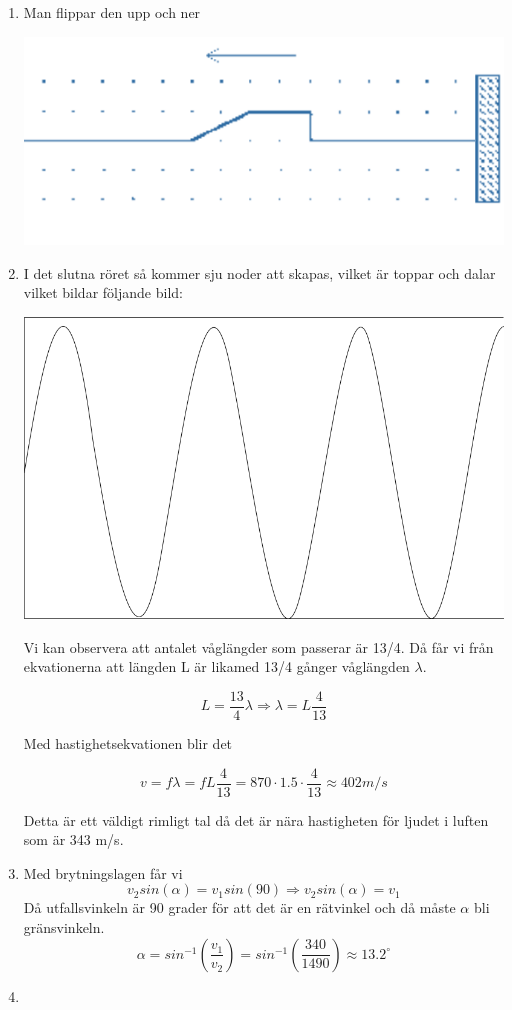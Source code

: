 \documentclass[a4paper,12pt]{article}
\begin{document}
\begin{enumerate}
    \item Man flippar den upp och ner
    
    \includegraphics{Figur 1.png}
    
    \item 
    I det slutna röret så kommer sju noder att skapas,
    vilket är toppar och dalar vilket bildar följande bild:
    \begin{center}
        \includegraphics[scale=0.5]{Figur 2.png}
    \end{center}

    Vi kan observera att antalet våglängder som passerar
    är 13/4. Då får vi från ekvationerna att längden L är 
    likamed 13/4 gånger våglängden $\lambda$.

    $$L=\frac{13}{4}\lambda \Rightarrow \lambda=L\frac{4}{13}$$

    Med hastighetsekvationen blir det 

    $$v=f\lambda=fL\frac{4}{13}=870\cdot 1.5\cdot \frac{4}{13}\approx 402m/s$$

    Detta är ett väldigt rimligt tal då det är nära hastigheten 
    för ljudet i luften som är 343 m/s.
    
    \item Med brytningslagen får vi
    $$v_2sin(\alpha)=v_1sin(90)\Rightarrow v_2sin(\alpha)=v_1$$
    Då utfallsvinkeln är 90 grader för att det är en rätvinkel
    och då måste $\alpha$ bli gränsvinkeln. 
    $$\alpha = sin^{-1}(\frac{v_1}{v_2})=sin^{-1}(\frac{340}{1490})\approx 13.2^\circ$$

    \item 
\end{enumerate}
\end{document}
